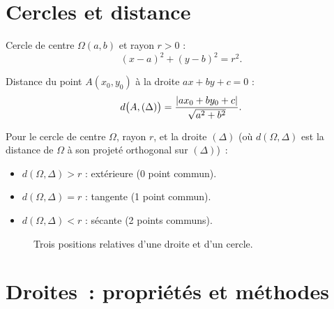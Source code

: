 \section{Cercles et distance}

\begin{defn}
Cercle de centre $\Omega(a,b)$ et rayon $r>0$ :
$$(x-a)^2 + (y-b)^2 = r^2.$$
\end{defn}

\begin{thm}
Distance du point $A(x_0,y_0)$ \`a la droite $ax+by+c=0$ :
$$d\bigl(A,(\Delta)\bigr) = \frac{\left|ax_0+by_0+c\right|}{\sqrt{a^2+b^2}}.$$
\end{thm}

\begin{thm}
Pour le cercle de centre $\Omega$, rayon $r$, et la droite $(\Delta)$
(o\`u $d(\Omega,\Delta)$ est la distance de $\Omega$ \`a son projet\'e orthogonal sur $(\Delta)$)~:
\begin{itemize}
  \item $d(\Omega,\Delta) > r$ : ext\'erieure (0 point commun).
  \item $d(\Omega,\Delta) = r$ : tangente (1 point commun).
  \item $d(\Omega,\Delta) < r$ : s\'ecante (2 points communs).
\end{itemize}
\end{thm}

\begin{figure}[H]
\centering
{}
\caption{Trois positions relatives d'une droite et d'un cercle.}
\end{figure}


\section{Droites~: propri\'et\'es et m\'ethodes}

